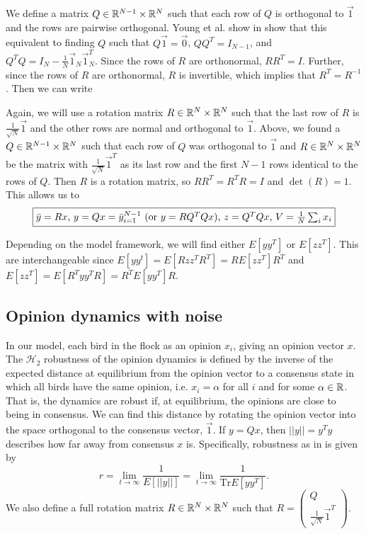 \documentclass{article}
\newcommand{\Tr}{\text{Tr}}
\begin{document}
We define a matrix $Q\in{\mathbb{R}}^{N-1}\times{\mathbb{R}}^N$ such that each row of $Q$ is orthogonal to $\vec{1}$ and the rows are pairwise orthogonal. Young et al. show in \cite{Young:2010fk} show that this equivalent to finding $Q$ such that $Q\vec{1}=\vec{0}$, $QQ^T=I_{N-1}$, and $Q^TQ=I_N-\frac{1}{N}\vec{1}_N\vec{1}_N^T$.  Since the rows of $R$ are orthonormal, $RR^T=I$. Further, since the rows of $R$ are orthonormal, $R$ is invertible, which implies that $R^T=R^{-1}$.  Then we can write


Again, we will use a rotation matrix $R\in{\mathbb{R}}^N\times{\mathbb{R}}^N$ such that the last row of $R$ is $\frac{1}{\sqrt{N}}\vec{1}$ and the other rows are normal and orthogonal to $\vec{1}$.
Above, we found a $Q\in{\mathbb{R}}^{N-1}\times{\mathbb{R}}^N$ such that each row of $Q$ was orthogonal to $\vec{1}$ and $R\in{\mathbb{R}}^N\times{\mathbb{R}}^N$ be the matrix with $\frac{1}{\sqrt{N}}\vec{1}^T$ as its last row and the first $N-1$ rows identical to the rows of $Q$. Then $R$ is a rotation matrix, so $RR^T=R^TR=I$ and $\det(R)=1$. This allows us to
\[
 \boxed{\bar{y}=Rx$, $y=Qx=\bar{y}_{i=1}^{N-1}$ (or $y=RQ^TQx$), $z=Q^TQx$, $V=\frac{1}{N}\sum_ix_i}
 \]
 
 Depending on the model framework, we will find either $E[yy^T]$ or $E[zz^T]$. This are interchangeable since $E[yy^t]=E[Rzz^TR^T]=RE[zz^T]R^T$ and $E[zz^T]=E[R^Tyy^TR]=R^TE[yy^T]R$.


\subsection{Opinion dynamics with noise }
In our model, each bird in the flock as an opinion $x_i$, giving an opinion vector $x$. The $\mathscr{H}_2$ robustness of the opinion dynamics is defined by the inverse of the expected distance at equilibrium from the opinion vector to a consensus state in which all birds have the same opinion, i.e. $x_i=\alpha$ for all $i$ and for some $\alpha\in{\mathbb{R}}$. That is, the dynamics are robust if, at equilibrium, the opinions are close to being in consensus. We can find this distance by rotating the opinion vector into the space orthogonal to the consensus vector, $\vec{1}$.  If $y=Qx$, then $||y||=y^Ty$ describes how far away from consensus $x$ is. Specifically, robustness as in \cite{Young:2010fk} is given by 
\begin{equation}
r=\lim_{t\to\infty}\frac{1}{E[||y||]}=\lim_{t\to\infty}\frac{1}{\Tr E[yy^T]}. \label{H2_robustness}
\end{equation}
We also define a full rotation matrix $R\in{\mathbb{R}}^N\times{\mathbb{R}}^N$ such that $R=\left(\begin{array}{cc} Q \\ \frac{1}{\sqrt{N}}\vec{1}^T \end{array}\right)$.
\end{document}
